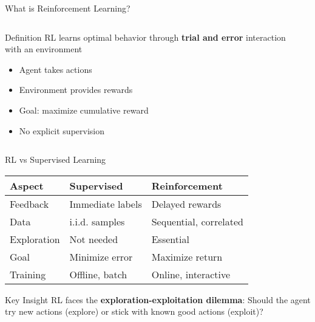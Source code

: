 \documentclass[aspectratio=169,10pt]{beamer}
\begin{document}
\begin{frame}{What is Reinforcement Learning?}
\begin{columns}
\begin{center}
\begin{block}{Definition}
RL learns optimal behavior through \textbf{trial and error} interaction with an environment
\end{block}

\begin{itemize}
    \item Agent takes actions
    \item Environment provides rewards
    \item Goal: maximize cumulative reward
    \item No explicit supervision
\end{itemize}
\end{center}
\begin{center}
\end{center}
\end{columns}
\end{frame}

\begin{frame}{RL vs Supervised Learning}
\begin{table}
\centering
\small
\begin{tabular}{|l|l|l|}
\hline
\textbf{Aspect} & \textbf{Supervised} & \textbf{Reinforcement} \\
\hline
Feedback & Immediate labels & Delayed rewards \\
Data & i.i.d. samples & Sequential, correlated \\
Exploration & Not needed & Essential \\
Goal & Minimize error & Maximize return \\
Training & Offline, batch & Online, interactive \\
\hline
\end{tabular}
\end{table}

\begin{block}{Key Insight}
RL faces the \textbf{exploration-exploitation dilemma}: 
Should the agent try new actions (explore) or stick with known good actions (exploit)?
\end{block}
\end{frame}
\end{document}
